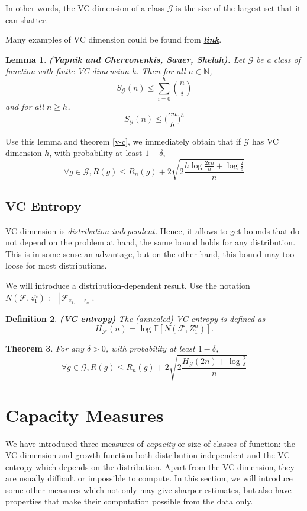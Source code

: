 \documentclass[12pt,reqno]{amsart}
\newtheorem{thm}{Theorem}[section]
\newtheorem{lem}[thm]{Lemma}
\newtheorem{definition}[thm]{Definition}
{ \theoremstyle{remark}\newtheorem*{remark}{Remark} }
\begin{document}
In other words, the VC dimension of a class $\mathcal{G}$ is the size of the largest set that it can shatter.

Many examples of VC dimension could be found from \cite{link5} \href{www.spsc.tugraz.at/system/files/vc_examples.pdf‎}{\textit{\textbf{link}}}.

\begin{lem}\textbf{(Vapnik and Chervonenkis, Sauer, Shelah).} Let $\mathcal{G}$ be a class of function with finite VC-dimension h. Then for all $n\in \mathbb{N}$,
$$
	S_{\mathcal{G}}(n) \leq \sum_{i=0}^h {n \choose i}
$$
and for all $n \geq h$,
$$
	S_{\mathcal{G}}(n) \leq \bigg ( \frac{en}{h} \bigg )^h
$$

\end{lem}

Use this lemma and theorem \ref{v-c}, we immediately  obtain that if $\mathcal{G}$ has VC dimension $h$, with probability at least $1-\delta$,
$$
	\forall g\in\mathcal{G}, R(g) \leq R_n(g)+ 2\sqrt{2\frac{h\log \frac{2en}{h}  + \log \frac{2}{\delta}}{n}}
$$

\subsection{VC Entropy}
VC dimension is \textit{distribution independent.} Hence, it allows to get bounds that do not depend on the problem
at hand, the same bound holds for any distribution. This is in some sense an advantage, but on the other hand, this bound may too loose for most distributions.

We will introduce a distribution-dependent result. Use the notation $N(\mathcal{F}, z_1^n) := |\mathcal{F}_{z_1,\ldots,z_n}|$.

\begin{definition} \textbf{(VC entropy)}
The (annealed) VC entropy is defined as
$$
	H_{\mathcal{F}}(n) = \log \mathbb{E}[N(\mathcal{F}, Z_1^n)].
$$
\end{definition}

\begin{thm}
For any $\delta > 0$, with probability at least $1-\delta$,
$$
	\forall g \in \mathcal{G}, R(g) \leq R_n(g)+ 2\sqrt{2\frac{ H_{\mathcal{G}}(2n) + \log \frac{2}{\delta}}{n}}
$$
\end{thm}





\section{Capacity Measures}
We have introduced three measures of \textit{capacity} or size of classes of function: the VC dimension and growth function both distribution independent and the VC entropy which depends on the distribution. Apart from the VC dimension, they are usually difficult or impossible to compute. In this section, we will introduce some other measures which not only may give sharper estimates, but also have properties that make their computation possible from the data only.
\end{document}
